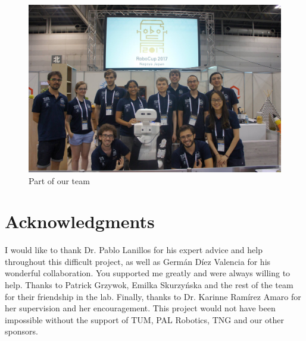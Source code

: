 \documentclass[a4paper, twocolumn]{article}
\begin{document}
    \begin{figure}[!t]
        \includegraphics[width=\columnwidth]{../img/team.jpg}
        \caption{Part of our team}
        \label{team}
    \end{figure}

    \section*{Acknowledgments}

    I would like to thank Dr. Pablo Lanillos for his expert advice and help throughout this difficult project, as well as Germ\'{a}n D\'{i}ez Valencia for his wonderful collaboration. You supported me greatly and were always willing to help. Thanks to Patrick Grzywok, Emilka Skurzy\'{n}ska and the rest of the team for their friendship in the lab. Finally, thanks to Dr. Karinne Ram\'{i}rez Amaro for her supervision and her encouragement. This project would not have been impossible without the support of TUM, PAL Robotics, TNG and our other sponsors.

    \vfill


	\pagebreak

	\twocolumn[{\begin{@twocolumnfalse}
		
		
	\end{@twocolumnfalse}}]

    \appendixpageoff
\end{document}
